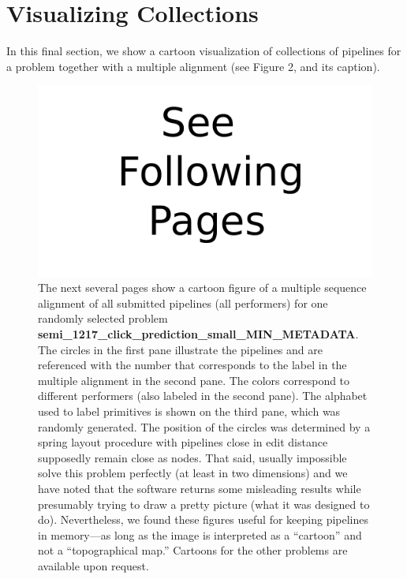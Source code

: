 \documentclass{article}
\begin{document}
\section{Visualizing Collections}
\label{sec:visualization}
In this final section, we show a cartoon visualization of collections
of pipelines for a problem together with a multiple alignment (see
Figure 2, and its caption).

\begin{figure}
\centering
\includegraphics{seebelow.pdf}
\caption{The next several pages show a cartoon figure of a multiple
  sequence alignment of all submitted pipelines (all performers) for
  one randomly selected problem {\bf
    semi\_1217\_click\_prediction\_small\_MIN\_METADATA}.  The circles
  in the first pane illustrate the pipelines and are referenced with
  the number that corresponds to the label in the multiple alignment
  in the second pane.  The colors correspond to different performers
  (also labeled in the second pane). The alphabet used to label
  primitives is shown on the third pane, which was randomly generated.
  The position of the circles was determined by a spring layout
  procedure with pipelines close in edit distance supposedly remain
  close as nodes.  That said, usually impossible solve this problem
  perfectly (at least in two dimensions) and we have noted that the
  software returns some misleading results while presumably trying to
  draw a pretty picture (what it was designed to do).  Nevertheless,
  we found these figures useful for keeping pipelines in memory---as
  long as the image is interpreted as a ``cartoon'' and not a
  ``topographical map.''  Cartoons for the other problems are
  available upon request.}
\label{fig:seebelow}
\end{figure}
\end{document}
